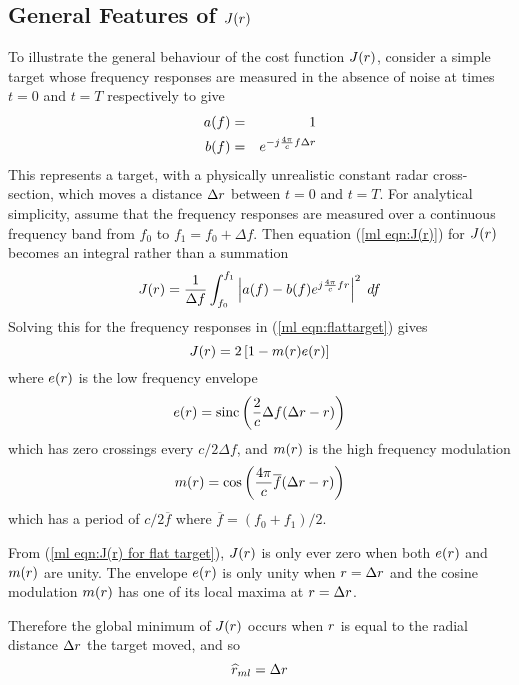 \subsection{General Features of $J({r})$}

To illustrate the general behaviour of the cost function $J({r})$, consider 
a simple target whose frequency responses are measured in the 
absence of noise at times $t=0$ and $t=T$ respectively to give
\begin{eqnarray}
a(f)&=&1{\nonumber}\\
b(f)&=&{e^{-j{\frac{4\pi}{c}} f{\Delta r}}}\label{ml eqn:flattarget}
\end{eqnarray}
This represents a target, with a physically unrealistic constant radar 
cross-section, which moves a distance ${\Delta r}$ between $t=0$ and $t=T$.  
For analytical simplicity, assume that the frequency responses are measured 
over a continuous frequency band from $f_0$ to $f_1=f_0+\Delta f$.  
Then equation (\ref{ml eqn:J(r)}) for $J({r})$ becomes an integral rather than 
a summation
\begin{equation}
J({r})=\frac{1}{\Delta f}\int_{f_0}^{f_1} 
\left|a(f)-b(f){e^{j{\frac{4\pi}{c}} f{r}}}\right|^2\;df
\end{equation}
Solving this for the frequency responses in (\ref{ml eqn:flattarget}) gives
\begin{equation}
J({r})=2\left[1-m({r})e({r})\right]\label{ml eqn:J(r) for flat target}
\end{equation}
where $e({r})$ is the low frequency envelope
\begin{equation}
e({r})={\mathop{\rm sinc}\nolimits}\left(\frac{2}{c}\Delta f({\Delta r}-{r})\right)
\end{equation}
which has zero crossings every $c/2\Delta f$, and $m({r})$ is the high 
frequency modulation
\begin{equation}
m({r})=\cos\left(\frac{4\pi}{c}\overline{f}({\Delta r}-{r})\right)
\end{equation}
which has a period of $c/2\overline{f}$ where $\overline{f}=(f_0+f_1)/2$.

From (\ref{ml eqn:J(r) for flat target}), $J({r})$ is only ever zero when both 
$e({r})$ and $m({r})$ are unity.  The envelope $e({r})$ is only unity when 
${r}={\Delta r}$ and the cosine modulation $m({r})$ has one of its local maxima at 
${r}={\Delta r}$.  

Therefore the global minimum of $J({r})$ occurs when ${r}$ is equal to the
radial distance ${\Delta r}$ the target moved, and so
\begin{equation}
\widehat{r}_{ml}={\Delta r}
\end{equation}

